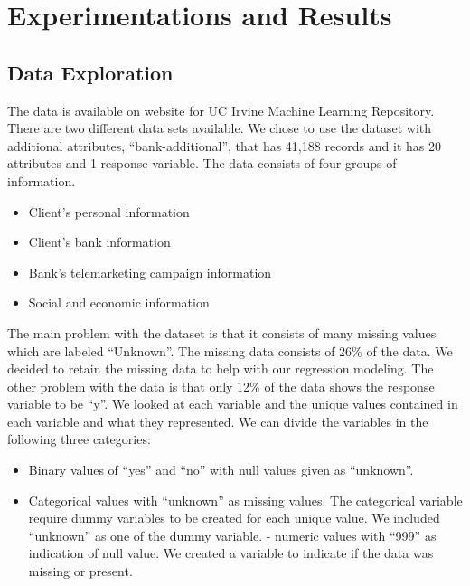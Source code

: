 \documentclass[english,floatsintext,man]{apa6}
\begin{document}
\section{Experimentations and
Results}\label{experimentations-and-results}

\subsection{Data Exploration}\label{data-exploration-1}

The data is available on website for UC Irvine Machine Learning
Repository. There are two different data sets available. We chose to use
the dataset with additional attributes, \enquote{bank-additional}, that
has 41,188 records and it has 20 attributes and 1 response variable. The
data consists of four groups of information.

\begin{itemize}
\itemsep1pt\parskip0pt
\item
  Client's personal information
\item
  Client's bank information
\item
  Bank's telemarketing campaign information
\item
  Social and economic information
\end{itemize}

The main problem with the dataset is that it consists of many missing
values which are labeled \enquote{Unknown}. The missing data consists of
26\% of the data. We decided to retain the missing data to help with our
regression modeling. The other problem with the data is that only 12\%
of the data shows the response variable to be \enquote{y}. We looked at
each variable and the unique values contained in each variable and what
they represented. We can divide the variables in the following three
categories:

\begin{itemize}
\itemsep1pt\parskip0pt
\item
  Binary values of \enquote{yes} and \enquote{no} with null values given
  as \enquote{unknown}.
\item
  Categorical values with \enquote{unknown} as missing values. The
  categorical variable require dummy variables to be created for each
  unique value. We included \enquote{unknown} as one of the dummy
  variable. - numeric values with \enquote{999} as indication of null
  value. We created a variable to indicate if the data was missing or
  present.
\end{itemize}
\end{document}
